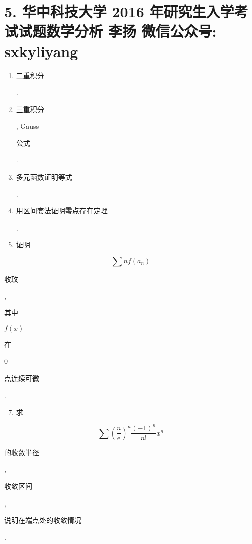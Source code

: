 \documentclass[10pt]{article}
\begin{document}
\section{5. 华中科技大学 2016 年研究生入学考试试题数学分析 
 李扬 
 微信公众号: sxkyliyang}
\begin{enumerate}
  \item \begin{CJK}{UTF8}{mj}二重积分\end{CJK}.

  \item \begin{CJK}{UTF8}{mj}三重积分\end{CJK}, Gauss \begin{CJK}{UTF8}{mj}公式\end{CJK}.

  \item \begin{CJK}{UTF8}{mj}多元函数证明等式\end{CJK}.

  \item \begin{CJK}{UTF8}{mj}用区间套法证明零点存在定理\end{CJK}.

  \item \begin{CJK}{UTF8}{mj}证明\end{CJK}

\end{enumerate}
$$
\sum n f\left(a_{n}\right)
$$
\begin{CJK}{UTF8}{mj}收玫\end{CJK}, \begin{CJK}{UTF8}{mj}其中\end{CJK} $f(x)$ \begin{CJK}{UTF8}{mj}在\end{CJK} 0 \begin{CJK}{UTF8}{mj}点连续可微\end{CJK}.

\begin{enumerate}
  \setcounter{enumi}{6}
  \item \begin{CJK}{UTF8}{mj}求\end{CJK}
\end{enumerate}
$$
\sum\left(\frac{n}{\mathrm{e}}\right)^{n} \frac{(-1)^{n}}{n !} x^{n}
$$
\begin{CJK}{UTF8}{mj}的收敛半径\end{CJK}, \begin{CJK}{UTF8}{mj}收敛区间\end{CJK}, \begin{CJK}{UTF8}{mj}说明在端点处的收敛情况\end{CJK}.
\end{document}
